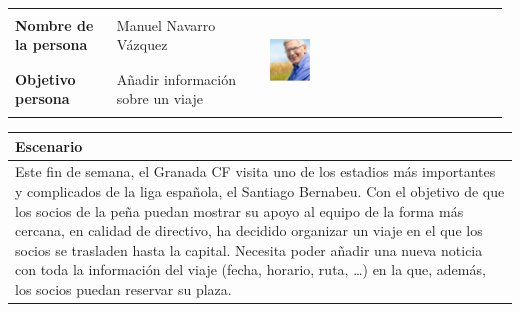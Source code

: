 \documentclass[11pt]{article}
\begin{document}
\begin{table}[H]
  \centering
  \begin{tabular}{p{0.2\linewidth}|p{0.3\linewidth}p{0.475\linewidth}}
    \toprule
    \textbf{Nombre de la persona} & Manuel Navarro Vázquez &\multirow{2}{*}{\begin{minipage}{1.\textwidth}\includegraphics[width=0.18\textwidth, height=26mm]{Pedro}\end{minipage}}\\
    \textbf{Objetivo persona} & Añadir información sobre un viaje & \\
    \bottomrule
  \end{tabular}

\begin{tabular}{p{1.028\linewidth}}
  \textbf{Escenario}\\
  \midrule
  Este fin de semana, el Granada CF visita uno de los estadios más importantes y complicados de la liga española, el Santiago Bernabeu. Con el objetivo de que los socios de la peña puedan mostrar su apoyo al equipo de la forma más cercana, en calidad de directivo, ha decidido organizar un viaje en el que los socios se trasladen hasta la capital. Necesita poder añadir una nueva noticia con toda la información del viaje (fecha, horario, ruta, \dots) en la que, además, los socios puedan reservar su plaza.
\end{tabular}
\end{table}
\end{document}
